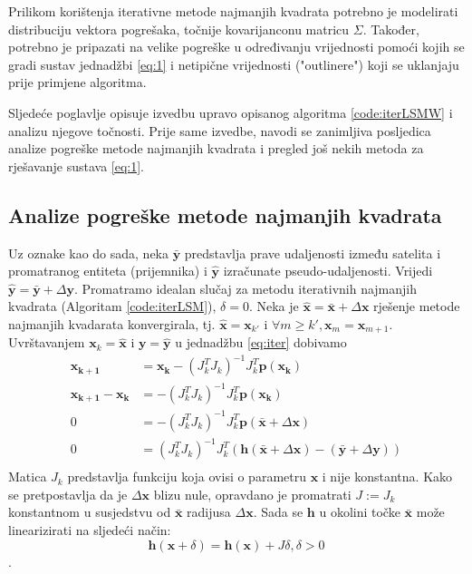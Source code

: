 \documentclass[a4paper,twoside,12pt]{memoir} %
\begin{document}
Prilikom korištenja iterativne metode najmanjih kvadrata potrebno je
modelirati distribuciju vektora pogrešaka, točnije kovarijanconu matricu $\Sigma$.
Također, potrebno je pripazati na 
velike pogreške u određivanju vrijednosti pomoći kojih se gradi sustav jednadžbi 
\ref{eq:1} i netipične vrijednosti ("outlinere") koji se uklanjaju prije primjene algoritma.

Sljedeće poglavlje opisuje izvedbu upravo opisanog algoritma \ref{code:iterLSMW} i 
analizu njegove točnosti. Prije same izvedbe, navodi se zanimljiva posljedica
analize pogreške metode najmanjih kvadrata i pregled još nekih metoda za rješavanje
sustava \ref{eq:1}.
\subsection{Analize pogreške metode najmanjih kvadrata}
Uz oznake kao do sada, neka $\bar{\mathbf{y}}$ predstavlja prave udaljenosti između satelita i promatranog entiteta (prijemnika) i $\hat{\mathbf{y}}$ izračunate pseudo-udaljenosti. 
Vrijedi
$\hat{\mathbf{y}} = \bar{\mathbf{y}} + \Delta \mathbf{y}$.
Promatramo idealan slučaj za metodu iterativnih najmanjih kvadrata (Algoritam \ref{code:iterLSM}), $\delta = 0$.
Neka je $\hat{\mathbf{x}} = \bar{\mathbf{x}} + \Delta \mathbf{x}$ rješenje metode najmanjih kvadarata konvergirala, tj. 
$\hat{\mathbf{x}} = \mathbf{x}_{k'}$ i $\forall m \geq k', \mathbf{x}_m = \mathbf{x}_{m+1}$.
Uvrštavanjem $\mathbf{x}_k = \hat{\mathbf{x}}$ i $\mathbf{y} = \hat{\mathbf{y}}$ u jednadžbu \ref{eq:iter} dobivamo
\begin{align*}
	\mathbf{x_{k+1}} &= \mathbf{x_{k}} - (J_k^TJ_k)^{-1}J_k^T \mathbf{p}(\mathbf{x_k}) \\
	\mathbf{x_{k+1}} - \mathbf{x_{k}} &= - (J_k^TJ_k)^{-1}J_k^T \mathbf{p}(\mathbf{x_k}) \\
	0 &= - (J_k^TJ_k)^{-1}J_k^T \mathbf{p}(\bar{\mathbf{x}} + \Delta \mathbf{x}) \\
	0 &= (J_k^TJ_k)^{-1}J_k^T (\mathbf{h}(\bar{\mathbf{x}} + \Delta \mathbf{x}) -(\bar{\mathbf{y}} + \Delta \mathbf{y}))\\
\end{align*}
Matica $J_k$ predstavlja funkciju koja ovisi o parametru $\mathbf{x}$ i nije konstantna.
Kako 
se pretpostavlja da je $\Delta \mathbf{x}$ blizu nule, opravdano je promatrati $J := J_k$ konstantnom u susjedstvu od $\bar{\mathbf{x}}$ radijusa $\Delta \mathbf{x}$.
Sada se $\mathbf{h}$ u okolini točke $\bar{\mathbf{x}}$ može linearizirati na sljedeći način:
$$\mathbf{h}(\mathbf{x}+\delta) = \mathbf{h}(\mathbf{x}) + J \delta, \delta > 0$$.\\
\end{document}
